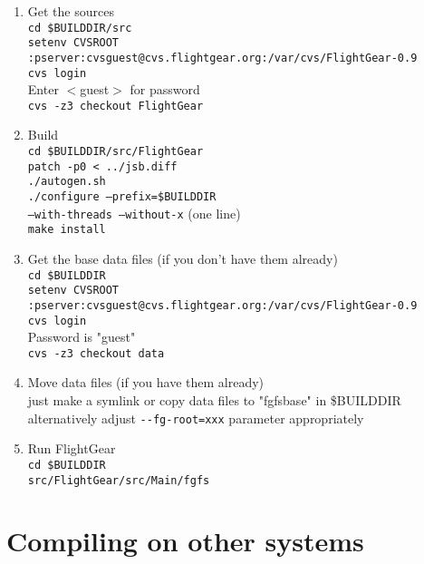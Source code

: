 \begin{enumerate}
\item Get the \FlightGear{} sources\\
 \texttt{cd {\$}BUILDDIR/src}\\
 \texttt{setenv CVSROOT :pserver:cvsguest@cvs.flightgear.org:/var/cvs/FlightGear-0.9}\\
 \texttt{cvs login}\\
 Enter $<$guest$>$ for password\\
 \texttt{cvs -z3 checkout FlightGear}

\item  Build \FlightGear{}\\
 \texttt{cd {\$}BUILDDIR/src/FlightGear}\\
 \texttt{patch -p0 < ../jsb.diff}\\ 
 \texttt{./autogen.sh}\\
 \texttt{./configure --prefix={\$}BUILDDIR }\\
 \texttt{--with-threads --without-x} (one line)\\
 \texttt{make install}
 
\item Get the base data files (if you don't have them already)\\
 \texttt{cd {\$}BUILDDIR}\\
 \texttt{setenv CVSROOT :pserver:cvsguest@cvs.flightgear.org:/var/cvs/FlightGear-0.9}\\
 \texttt{cvs login}\\
 Password is "guest"\\
 \texttt{cvs -z3 checkout data}

\item Move data files (if you have them already)\\
 just make a symlink or copy data files to "fgfsbase" in {\$}BUILDDIR\\
 alternatively adjust \texttt{-$ $-fg-root=xxx} parameter appropriately

\item Run FlightGear\\
 \texttt{cd {\$}BUILDDIR}\\
 \texttt{src/FlightGear/src/Main/fgfs}
\end{enumerate}

\section{Compiling on other systems}

